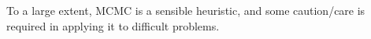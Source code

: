 \documentclass[twoside,12pt]{article}
\begin{document}
To a large extent, MCMC is a sensible heuristic, and some caution/care is required in applying it to difficult problems.





%
%
%
%
%
%
%
%
%
%
%
\end{document}
